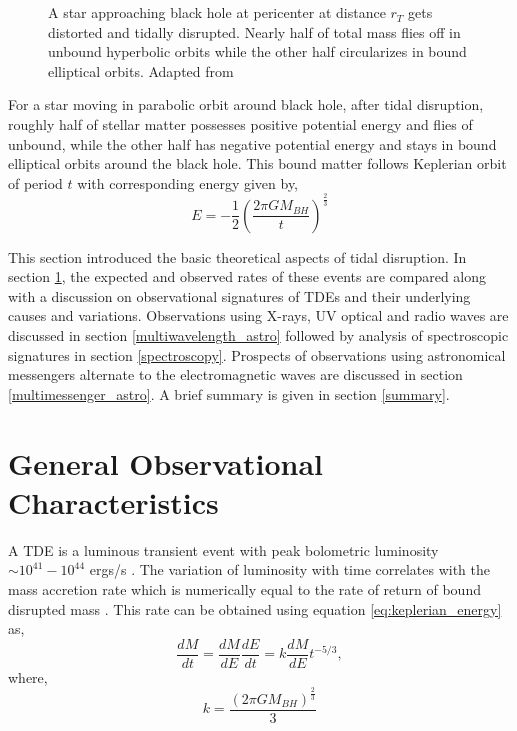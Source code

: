 \documentclass{tda}
\begin{document}
\begin{figure} [h]
\begin{minipage} {.45\textwidth}
		\caption{A star approaching black hole at pericenter at distance \(r^{}_T\) gets distorted and tidally disrupted. Nearly half of total mass flies off in unbound hyperbolic orbits while the other half circularizes in bound elliptical orbits. Adapted from \cite{rees_tidal_1988}}
	\end{minipage}
\end{figure}

For a star moving in parabolic orbit around black hole, after tidal disruption, roughly half of stellar matter possesses positive potential energy and flies of unbound, while the other half has negative potential energy and stays in bound elliptical orbits around the black hole. This bound matter follows Keplerian orbit of period \(t\) with corresponding energy given by,
\begin{equation}
	E = -\frac{1}{2} \left( \frac{2 \pi G M^{}_{BH}}{t} \right)^\frac{2}{3}
	\label{eq:keplerian_energy}
\end{equation}

This section introduced the basic theoretical aspects of tidal disruption. In section \ref{gen_observations}, the expected and observed rates of these events are compared along with a discussion on observational signatures of TDEs and their underlying causes and variations. Observations using X-rays, UV optical and radio waves are discussed in section \ref{multiwavelength_astro} followed by analysis of spectroscopic signatures in section \ref{spectroscopy}. Prospects of observations using astronomical messengers alternate to the electromagnetic waves are discussed in section \ref{multimessenger_astro}. A brief summary is given in section \ref{summary}.


\section{General Observational Characteristics} \label{gen_observations}

A TDE is a luminous transient event with peak bolometric luminosity \(\sim 10^{41} - 10^{44}\) ergs/s \cite{lodato_multiband_2011, bonnerot_simulating_2020}. The variation of luminosity with time correlates with the mass accretion rate which is numerically equal to the rate of return of bound disrupted mass \cite{phinney_manifestations_1989}. This rate can be obtained using equation \ref{eq:keplerian_energy} as,
\begin{equation}
	\frac{dM}{dt} = \frac{dM}{dE} \frac{dE}{dt} = k \frac{dM}{dE} t^{-5/3},
	\label{eq:tde_luminosity_time}
\end{equation}
where, \[k=\frac{\left({2 \pi G M_{BH}}\right)^{\frac{2}{3}}}{3}\]
\end{document}
